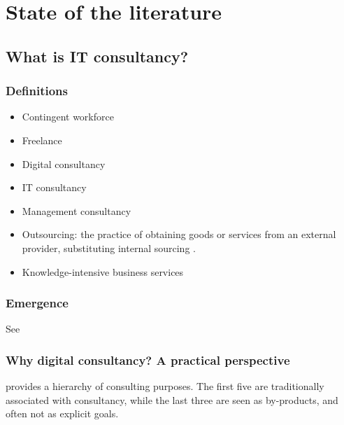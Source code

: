 \documentclass[12pt]{article}
\providecommand{\tightlist}{%
  \setlength{\itemsep}{0pt}\setlength{\parskip}{0pt}}
\begin{document}
\hypertarget{state-of-the-literature}{%
\section{State of the literature}\label{state-of-the-literature}}

\hypertarget{what-is-it-consultancy}{%
\subsection{What is IT consultancy?}\label{what-is-it-consultancy}}

\hypertarget{definitions}{%
\subsubsection{Definitions}\label{definitions}}

\begin{itemize}
\tightlist
\item
  Contingent workforce
\item
  Freelance
\item
  Digital consultancy
\item
  IT consultancy
\item
  Management consultancy
\item
  Outsourcing: the practice of obtaining goods or services from an
  external provider, substituting internal sourcing \citep[
  2]{lacity2012}.
\item
  Knowledge-intensive business services
\end{itemize}

\hypertarget{emergence}{%
\subsubsection{Emergence}\label{emergence}}

See \citep[ 120-130]{armbruster2006}

\hypertarget{why-digital-consultancy-a-practical-perspective}{%
\subsubsection{Why digital consultancy? A practical
perspective}\label{why-digital-consultancy-a-practical-perspective}}

\citet{turner1982} provides a hierarchy of consulting purposes. The
first five are traditionally associated with consultancy, while the last
three are seen as by-products, and often not as explicit goals.
\end{document}
